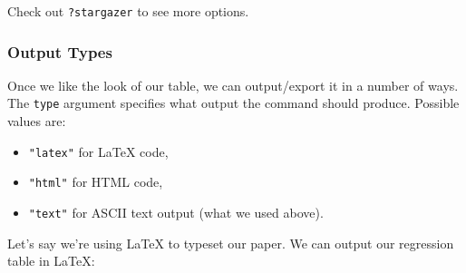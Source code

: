 \documentclass[]{book}
\providecommand{\tightlist}{%
  \setlength{\itemsep}{0pt}\setlength{\parskip}{0pt}}
\begin{document}
Check out \texttt{?stargazer} to see more options.

\hypertarget{output-types}{%
\subsubsection*{Output Types}\label{output-types}}

Once we like the look of our table, we can output/export it in a number of ways. The \texttt{type} argument specifies what output the command should produce. Possible values are:

\begin{itemize}
\tightlist
\item
  \texttt{"latex"} for LaTeX code,
\item
  \texttt{"html"} for HTML code,
\item
  \texttt{"text"} for ASCII text output (what we used above).
\end{itemize}

Let's say we're using LaTeX to typeset our paper. We can output our regression table in LaTeX:
\end{document}
